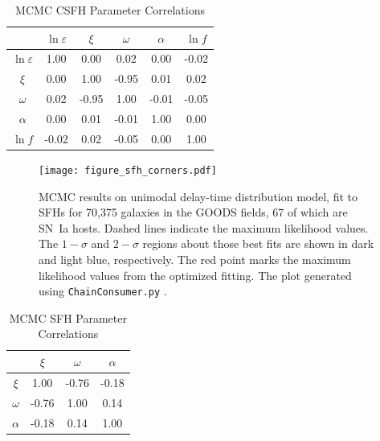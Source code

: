 \documentclass[apj, linenumbers]{aastex62}
\begin{document}
\begin{table}[h]
    \centering
    \caption{MCMC CSFH Parameter Correlations}
    \label{tab:parameter_correlations1}
    \begin{tabular}{c|ccccc}
         & $\ln\varepsilon$ & $\xi$ & $\omega$ & $\alpha$ & $\ln f$\\ 
        \hline
        $\ln\varepsilon$ &  1.00 &  0.00 &  0.02 &  0.00 & -0.02 \\ 
                   $\xi$ &  0.00 &  1.00 & -0.95 &  0.01 &  0.02 \\ 
                $\omega$ &  0.02 & -0.95 &  1.00 & -0.01 & -0.05 \\ 
                $\alpha$ &  0.00 &  0.01 & -0.01 &  1.00 &  0.00 \\ 
                 $\ln f$ & -0.02 &  0.02 & -0.05 &  0.00 &  1.00 \\ 
        \hline
    \end{tabular}
\end{table}
\clearpage
\begin{figure}[t] 
   \centering
   \texttt{[image: figure\_sfh\_corners.pdf]} 
   \caption{\footnotesize MCMC results on unimodal delay-time distribution model, fit to SFHs for 70,375 galaxies in the GOODS fields, 67 of which are SN~Ia hosts. Dashed lines indicate the maximum likelihood values. The $1-\sigma$ and $2-\sigma$ regions about those best fits are shown in dark and light blue, respectively. The red point marks the maximum likelihood values from the optimized fitting. The plot generated using {\tt ChainConsumer.py} \citep{Hinton:2016qy}.}
   \label{fig:mcmc_sfh}
\end{figure}

\begin{table}[h]
    \centering
    \caption{MCMC SFH Parameter Correlations}
    \label{tab:parameter_correlations2}
    \begin{tabular}{c|ccc}
         & $\xi$ & $\omega$ & $\alpha$\\ 
        \hline
           $\xi$ &  1.00 & -0.76 & -0.18 \\ 
        $\omega$ & -0.76 &  1.00 &  0.14 \\ 
        $\alpha$ & -0.18 &  0.14 &  1.00 \\ 
        \hline
    \end{tabular}
\end{table}
\clearpage
\end{document}
